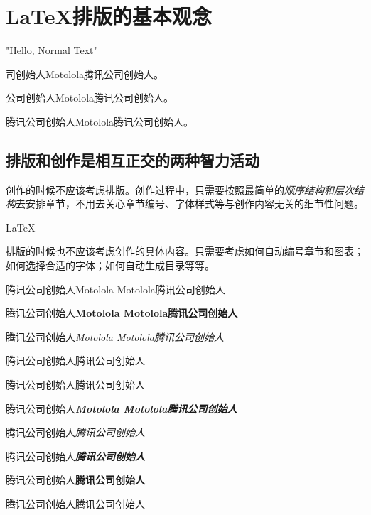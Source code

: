 \section{\LaTeX{}排版的基本观念}

{
{}

{}

{}

{}

{}

{}

{}

{}

"Hello, Normal Text"
}

\Warning{}司创始人Motolola腾讯公司创始人。

\Warning{}公司创始人Motolola腾讯公司创始人。

\Warning{}腾讯公司创始人Motolola腾讯公司创始人。

\subsection{排版和创作是相互正交的两种智力活动}
创作的时候不应该考虑排版。创作过程中，只需要按照最简单的\emph{顺序结构和层次结构}去安排章节，不用去关心章节编号、字体样式等与创作内容无关的细节性问题。

\LaTeX

排版的时候也不应该考虑创作的具体内容。只需要考虑如何自动编号章节和图表；如何选择合适的字体；如何自动生成目录等等。

\begingroup
腾讯公司创始人Motolola Motolola腾讯公司创始人

腾讯公司创始人\bfseries{Motolola Motolola}腾讯公司创始人

腾讯公司创始人\itshape{Motolola Motolola}腾讯公司创始人

腾讯公司创始人腾讯公司创始人

腾讯公司创始人腾讯公司创始人

腾讯公司创始人\bfseries\itshape{Motolola Motolola}腾讯公司创始人

腾讯公司创始人\itshape{}腾讯公司创始人

腾讯公司创始人\bfseries\itshape{}腾讯公司创始人

腾讯公司创始人\bfseries{}腾讯公司创始人

腾讯公司创始人腾讯公司创始人

